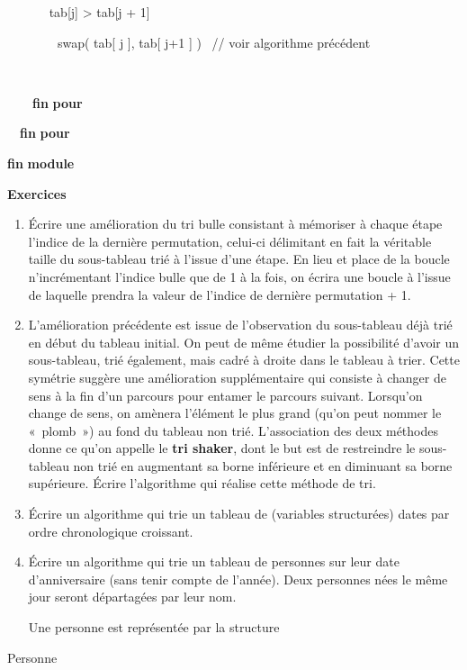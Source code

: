 {\sffamily
\ \ \ \ \ \  tab[j] {\textgreater} tab[j + 1]
\ \ \ \ \ \ \ \ \ \ }

{\sffamily
\ \ \ \ \ \ \ \ swap( tab[ j ], tab[ j+1 ] ) \ // voir algorithme
précédent}

{\sffamily
\ \ \ \ \ \  }

{\sffamily
\ \ \ \ {\textbf{fin}}{
}{\textbf{pour}}}

{\sffamily
\ \ {\textbf{fin}}{
}{\textbf{pour}}}

{\sffamily
{\textbf{fin}}{
}{\textbf{module}}}


\bigskip

{\sffamily\bfseries\upshape
Exercices}

\liststyleExercice
\setcounter{saveenum}{\value{enumi}}
\begin{enumerate}
\setcounter{enumi}{\value{saveenum}}
\item {
Écrire une amélioration du tri bulle consistant à mémoriser à chaque
étape l’indice de la dernière permutation, celui-ci délimitant en fait
la véritable taille du sous-tableau trié à l’issue d’une étape. En lieu
et place de la boucle  n’incrémentant l’indice
bulle que de 1 à la fois, on écrira une boucle  à l’issue de laquelle  prendra la
valeur de l’indice de dernière permutation + 1.}
\item {
L’amélioration précédente est issue de l’observation du sous-tableau
déjà trié en début du tableau initial. On peut de même étudier la
possibilité d’avoir un sous-tableau, trié également, mais cadré à
droite dans le tableau à trier. Cette symétrie suggère une amélioration
supplémentaire qui consiste à changer de sens à la fin d’un parcours
pour entamer le parcours suivant. Lorsqu’on change de sens, on amènera
l’élément le plus grand (qu’on peut nommer le «~plomb~») au fond du
tableau non trié. L’association des deux méthodes donne ce qu’on
appelle le \textbf{tri shaker}, dont le but est de restreindre le
sous-tableau non trié en augmentant sa borne inférieure et en diminuant
sa borne supérieure. Écrire l’algorithme qui réalise cette méthode de
tri.}
\item {
Écrire un algorithme qui trie un tableau de (variables structurées)
dates par ordre chronologique croissant.}
\item {
Écrire un algorithme qui trie un tableau de personnes sur leur date
d'anniversaire (sans tenir compte de
l'année). Deux personnes nées le même jour seront
départagées par leur nom.}

{
Une personne est représentée par la structure }
\end{enumerate}
{\sffamily
{} Personne 
}


